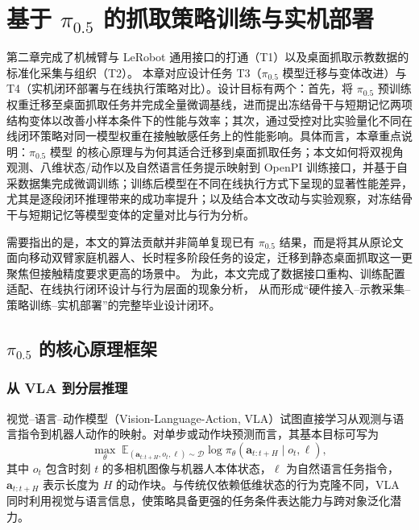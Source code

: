 
\chapter{基于 $\pi_{0.5}$ 的抓取策略训练与实机部署}
\label{chap:pi05-franka}

第二章完成了机械臂与 LeRobot 通用接口的打通（T1）以及桌面抓取示教数据的标准化采集与组织（T2）。
本章对应设计任务 T3（$\pi_{0.5}$ 模型迁移与变体改进）与 T4（实机闭环部署与在线执行策略对比）。设计目标有两个：首先，将 $\pi_{0.5}$ 预训练权重迁移至桌面抓取任务并完成全量微调基线，进而提出冻结骨干与短期记忆两项结构变体以改善小样本条件下的性能与效率；其次，通过受控对比实验量化不同在线闭环策略对同一模型权重在接触敏感任务上的性能影响。具体而言，本章重点说明：$\pi_{0.5}$ 模型\cite{black2025pi05} 的核心原理与为何其适合迁移到桌面抓取任务；本文如何将双视角观测、八维状态/动作以及自然语言任务提示映射到 OpenPI 训练接口，并基于自采数据集完成微调训练；训练后模型在不同在线执行方式下呈现的显著性能差异，尤其是逐段闭环推理带来的成功率提升；以及结合本文改动与实验观察，对冻结骨干与短期记忆等模型变体的定量对比与行为分析。

需要指出的是，本文的算法贡献并非简单复现已有 $\pi_{0.5}$ 结果，而是将其从原论文面向移动双臂家庭机器人、长时程多阶段任务的设定，迁移到静态桌面抓取这一更聚焦但接触精度要求更高的场景中。
为此，本文完成了数据接口重构、训练配置适配、在线执行闭环设计与行为层面的现象分析，
从而形成“硬件接入--示教采集--策略训练--实机部署”的完整毕业设计闭环。

\section{$\pi_{0.5}$ 的核心原理框架}
\label{sec:pi05-core}

\subsection{从 VLA 到分层推理}

视觉--语言--动作模型（Vision-Language-Action, VLA）试图直接学习从观测与语言指令到机器人动作的映射。对单步或动作块预测而言，其基本目标可写为
\begin{equation}
  \max_{\theta}\;
  \mathbb{E}_{(\mathbf{a}_{t:t+H},o_t,\ell)\sim\mathcal{D}}
  \log \pi_{\theta}(\mathbf{a}_{t:t+H}\mid o_t,\ell),
  \label{eq:pi05-il}
\end{equation}
其中 $o_t$ 包含时刻 $t$ 的多相机图像与机器人本体状态，$\ell$ 为自然语言任务指令，$\mathbf{a}_{t:t+H}$ 表示长度为 $H$ 的动作块。与传统仅依赖低维状态的行为克隆不同，VLA 同时利用视觉与语言信息，使策略具备更强的任务条件表达能力与跨对象泛化潜力\cite{black2024pi0}。

